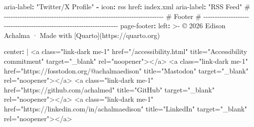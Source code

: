 \documentclass[
  doc,
  floatsintext,
  longtable,
  a4paper,
  nolmodern,
  notxfonts,
  notimes,
  12pt,
  colorlinks=true,linkcolor=blue,citecolor=blue,urlcolor=blue]{apa7}
\newenvironment{Shaded}{\begin{snugshade}}{\end{snugshade}}
\newcommand{\AttributeTok}[1]{\textcolor[rgb]{0.40,0.45,0.13}{#1}}
\newcommand{\CharTok}[1]{\textcolor[rgb]{0.13,0.47,0.30}{#1}}
\newcommand{\CommentTok}[1]{\textcolor[rgb]{0.37,0.37,0.37}{#1}}
\newcommand{\FunctionTok}[1]{\textcolor[rgb]{0.28,0.35,0.67}{#1}}
\newcommand{\KeywordTok}[1]{\textcolor[rgb]{0.00,0.23,0.31}{\textbf{#1}}}
\newcommand{\NormalTok}[1]{\textcolor[rgb]{0.00,0.23,0.31}{#1}}
\newcommand{\StringTok}[1]{\textcolor[rgb]{0.13,0.47,0.30}{#1}}
\begin{document}
\begin{Shaded}
\begin{Highlighting}[]
\AttributeTok{        }\FunctionTok{aria{-}label}\KeywordTok{:}\AttributeTok{ }\StringTok{"Twitter/X Profile"}
\AttributeTok{        }
\AttributeTok{      }\KeywordTok{{-}}\AttributeTok{ }\FunctionTok{icon}\KeywordTok{:}\AttributeTok{ rss}
\AttributeTok{        }\FunctionTok{href}\KeywordTok{:}\AttributeTok{ index.xml}
\AttributeTok{        }\FunctionTok{aria{-}label}\KeywordTok{:}\AttributeTok{ }\StringTok{"RSS Feed"}
\AttributeTok{  }
\CommentTok{  \# {-}{-}{-}{-}{-}{-}{-}{-}{-}{-}{-}{-}{-}{-}{-}{-}{-}{-}{-}{-}{-}{-}{-}{-}{-}{-}{-}{-}{-}{-}{-}{-}{-}{-}{-}{-}{-}{-}{-}{-}{-}{-}{-}{-}{-}{-}{-}{-}{-}{-}{-}{-}{-}{-}{-}{-}{-}{-}{-}{-}{-}{-}{-}{-}{-}{-}{-}{-}{-}{-}}
\CommentTok{  \# Footer}
\CommentTok{  \# {-}{-}{-}{-}{-}{-}{-}{-}{-}{-}{-}{-}{-}{-}{-}{-}{-}{-}{-}{-}{-}{-}{-}{-}{-}{-}{-}{-}{-}{-}{-}{-}{-}{-}{-}{-}{-}{-}{-}{-}{-}{-}{-}{-}{-}{-}{-}{-}{-}{-}{-}{-}{-}{-}{-}{-}{-}{-}{-}{-}{-}{-}{-}{-}{-}{-}{-}{-}{-}{-}}
\AttributeTok{  }\FunctionTok{page{-}footer}\KeywordTok{:}
\FunctionTok{    left}\KeywordTok{: }\CharTok{\textgreater{}{-}}
\NormalTok{      © 2026 Edison Achalma · Made with [Quarto](https://quarto.org)}
      
\FunctionTok{    center}\KeywordTok{: }\CharTok{|}
\NormalTok{      \textless{}a class="link{-}dark me{-}1" href="/accessibility.html" title="Accessibility commitment" target="\_blank" rel="noopener"\textgreater{}\textless{}/a\textgreater{}}
\NormalTok{      \textless{}a class="link{-}dark me{-}1" href="https://fosstodon.org/@achalmaedison" title="Mastodon" target="\_blank" rel="noopener"\textgreater{}\textless{}/a\textgreater{}}
\NormalTok{      \textless{}a class="link{-}dark me{-}1" href="https://github.com/achalmed" title="GitHub" target="\_blank" rel="noopener"\textgreater{}\textless{}/a\textgreater{}}
\NormalTok{      \textless{}a class="link{-}dark me{-}1" href="https://linkedin.com/in/achalmaedison" title="LinkedIn" target="\_blank" rel="noopener"\textgreater{}\textless{}/a\textgreater{}}
      

\end{Highlighting}
\end{Shaded}
\end{document}
